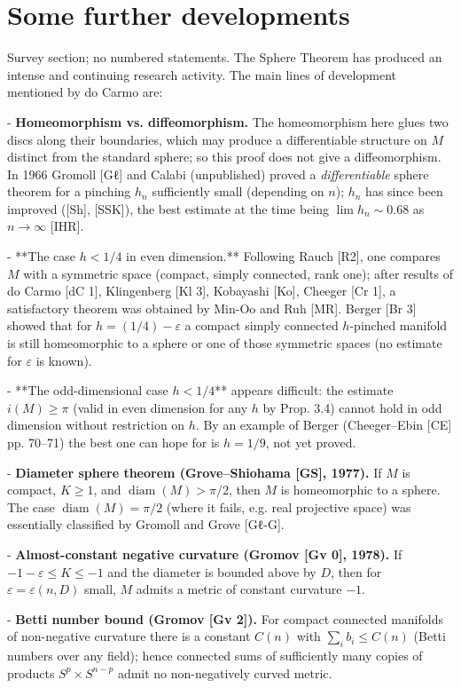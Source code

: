 \section{Some further developments}

Survey section; no numbered statements. The Sphere Theorem has produced an intense
and continuing research activity. The main lines of development mentioned by do
Carmo are:

- \textbf{Homeomorphism vs. diffeomorphism.} The homeomorphism here glues two discs along
  their boundaries, which may produce a differentiable structure on $M$ distinct from
  the standard sphere; so this proof does not give a diffeomorphism. In 1966 Gromoll
  [Gℓ] and Calabi (unpublished) proved a \emph{differentiable} sphere theorem for a
  pinching $h_n$ sufficiently small (depending on $n$); $h_n$ has since been improved
  ([Sh], [SSK]), the best estimate at the time being $\lim h_n\sim0.68$ as
  $n\to\infty$ [IHR].

- **The case $h<1/4$ in even dimension.** Following Rauch [R2], one compares $M$ with
  a symmetric space (compact, simply connected, rank one); after results of do Carmo
  [dC 1], Klingenberg [Kl 3], Kobayashi [Ko], Cheeger [Cr 1], a satisfactory theorem
  was obtained by Min-Oo and Ruh [MR]. Berger [Br 3] showed that for $h=(1/4)-\varepsilon$
  a compact simply connected $h$-pinched manifold is still homeomorphic to a sphere or
  one of those symmetric spaces (no estimate for $\varepsilon$ is known).

- **The odd-dimensional case $h<1/4$** appears difficult: the estimate $i(M)\geq\pi$
  (valid in even dimension for any $h$ by Prop. 3.4) cannot hold in odd dimension
  without restriction on $h$. By an example of Berger (Cheeger–Ebin [CE] pp. 70–71)
  the best one can hope for is $h=1/9$, not yet proved.

- \textbf{Diameter sphere theorem (Grove–Shiohama [GS], 1977).} If $M$ is compact,
  $K\geq1$, and $\operatorname{diam}(M)>\pi/2$, then $M$ is homeomorphic to a sphere.
  The case $\operatorname{diam}(M)=\pi/2$ (where it fails, e.g. real projective space)
  was essentially classified by Gromoll and Grove [Gℓ-G].

- \textbf{Almost-constant negative curvature (Gromov [Gv 0], 1978).} If
  $-1-\varepsilon\leq K\leq-1$ and the diameter is bounded above by $D$, then for
  $\varepsilon=\varepsilon(n,D)$ small, $M$ admits a metric of constant curvature
  $-1$.

- \textbf{Betti number bound (Gromov [Gv 2]).} For compact connected manifolds of
  non-negative curvature there is a constant $C(n)$ with $\sum_i b_i\leq C(n)$ (Betti
  numbers over any field); hence connected sums of sufficiently many copies of
  products $S^p\times S^{n-p}$ admit no non-negatively curved metric.

